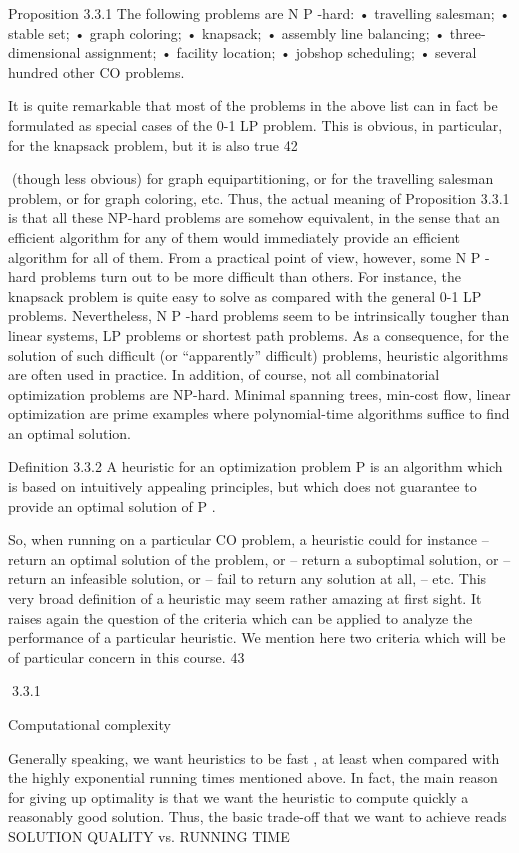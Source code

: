 \documentclass[titlepage]{book}
\theoremstyle{plain}
\theoremstyle{definition}
\theoremstyle{remark}
\begin{document}
Proposition 3.3.1 The following problems are N P -hard:
• travelling salesman;
• stable set;
• graph coloring;
• knapsack;
• assembly line balancing;
• three-dimensional assignment;
• facility location;
• jobshop scheduling;
• several hundred other CO problems.

It is quite remarkable that most of the problems in the above list can in fact be formulated as special
cases of the 0-1 LP problem. This is obvious, in particular, for the knapsack problem, but it is also true
42

(though less obvious) for graph equipartitioning, or for the travelling salesman problem, or for graph
coloring, etc. Thus, the actual meaning of Proposition 3.3.1 is that all these NP-hard problems are
somehow equivalent, in the sense that an efficient algorithm for any of them would immediately provide
an efficient algorithm for all of them.
From a practical point of view, however, some N P -hard problems turn out to be more difficult than
others. For instance, the knapsack problem is quite easy to solve as compared with the general 0-1 LP
problems. Nevertheless, N P -hard problems seem to be intrinsically tougher than linear systems, LP
problems or shortest path problems.
As a consequence, for the solution of such difficult (or “apparently” difficult) problems, heuristic algorithms are often used in practice.
In addition, of course, not all combinatorial optimization problems are NP-hard. Minimal spanning trees,
min-cost flow, linear optimization are prime examples where polynomial-time algorithms suffice to find
an optimal solution.

Definition 3.3.2 A heuristic for an optimization problem P is an algorithm which is based on intuitively
appealing principles, but which does not guarantee to provide an optimal solution of P .

So, when running on a particular CO problem, a heuristic could for instance
– return an optimal solution of the problem, or
– return a suboptimal solution, or
– return an infeasible solution, or
– fail to return any solution at all,
– etc.
This very broad definition of a heuristic may seem rather amazing at first sight. It raises again the
question of the criteria which can be applied to analyze the performance of a particular heuristic. We
mention here two criteria which will be of particular concern in this course.
43

3.3.1

Computational complexity

Generally speaking, we want heuristics to be fast , at least when compared with the highly exponential
running times mentioned above. In fact, the main reason for giving up optimality is that we want the
heuristic to compute quickly a reasonably good solution. Thus, the basic trade-off that we want to achieve
reads
SOLUTION QUALITY vs. RUNNING TIME
\end{document}
